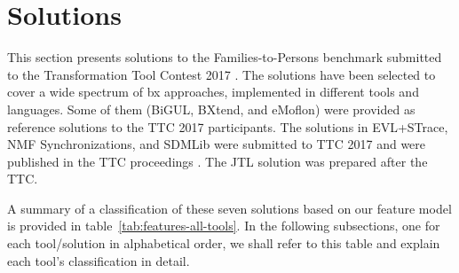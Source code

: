 \section{Solutions}
\label{sec:Solutions}

This section presents solutions to the Families-to-Per\-sons benchmark submitted to the Transformation Tool Contest 2017 \cite{Anjorin2017a}.
The solutions have been selected to cover a wide spectrum of bx approaches, implemented in different tools and languages.
Some of them (BiGUL, BXtend, and eMoflon) were provided as reference solutions to the TTC 2017 participants. The solutions in EVL+STrace, NMF Synchronizations, and SDMLib were submitted to TTC 2017 and were published in the TTC proceedings \cite{Hinkel2017,Samimi-Dehkordi2017,Zundorf2017}.
The JTL solution was prepared after the TTC. 

A summary of a classification of these seven solutions based on our feature model is provided in table~\ref{tab:features-all-tools}.
In the following subsections, one for each tool/solution in alphabetical order, we shall refer to this table and explain each tool's classification in detail.

\renewcommand{\arraystretch}{1.2}

